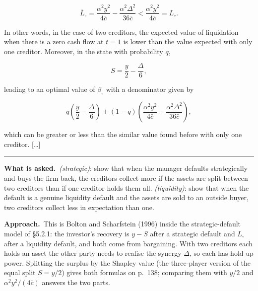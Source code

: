\documentclass[11pt,a4paper]{article}
\newcommand{\asked}{\par\medskip\noindent\textbf{What is asked.}~}
\newcommand{\approach}{\par\smallskip\noindent\textbf{Approach.}~}
\newcommand{\stmtend}{\par\endgroup\nopagebreak\noindent\rule{\linewidth}{0.4pt}\par\medskip}
\begin{document}
\[\overline{L}_\circ = \frac{\alpha^2 y^2}{4\bar c} - \frac{\alpha^2 \Delta^2}{36\bar c} < \frac{\alpha^2 y^2}{4\bar c} = L_\circ.\]

In other words, in the case of two creditors, the expected value of liquidation when there is a zero
cash flow at \(t = 1\) is lower than the value expected with only one creditor. Moreover, in the
state with probability \(q\),

\[S = \frac{y}{2} - \frac{\Delta}{6},\]

leading to an optimal value of \(\beta_\circ\) with a denominator given by

\[q\left(\frac{y}{2} - \frac{\Delta}{6}\right) + (1 - q)\left(\frac{\alpha^2 y^2}{4\bar c} - \frac{\alpha^2 \Delta^2}{36\bar c}\right),\]

which can be greater or less than the similar value found before with only one creditor.
{[}\ldots{]}
\stmtend

\asked \emph{(strategic)}: show that when the manager defaults strategically and buys the firm back,
the creditors collect more if the assets are split between two creditors than if one creditor holds
them all. \emph{(liquidity)}: show that when the default is a genuine liquidity default and the assets are
sold to an outside buyer, two creditors collect less in expectation than one.

\approach This is Bolton and Scharfstein (1996) inside the strategic-default model of \S5.2.1: the
investor's recovery is $y-S$ after a strategic default and $L_\circ$ after a liquidity default, and both
come from bargaining. With two creditors each holds an asset the other party needs to realise the
synergy $\Delta$, so each has hold-up power. Splitting the surplus by the Shapley value (the three-player
version of the equal split $S=y/2$) gives both formulas on p.~138; comparing them with $y/2$ and
$\alpha^2y^2/(4\bar c)$ answers the two parts.
\end{document}
